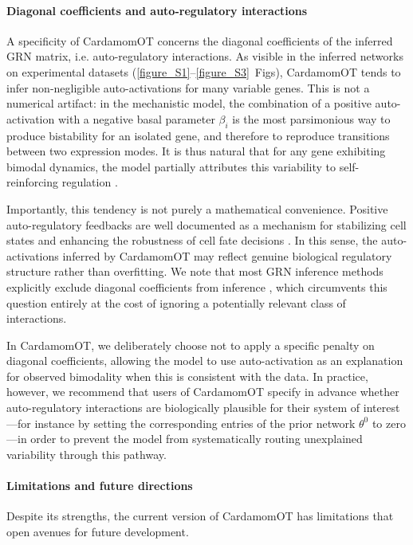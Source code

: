 \documentclass[a4paper, 11pt]{article}
\theoremstyle{plain}
\theoremstyle{remark}
\begin{document}
\paragraph{Diagonal coefficients and auto-regulatory interactions}
A specificity of CardamomOT concerns the diagonal coefficients of the inferred GRN matrix, i.e. auto-regulatory interactions. As visible in the inferred networks on experimental datasets (\ref{figure_S1}--\ref{figure_S3}~Figs), CardamomOT tends to infer non-negligible auto-activations for many variable genes. This is not a numerical artifact: in the mechanistic model, the combination of a positive auto-activation with a negative basal parameter $\beta_i$ is the most parsimonious way to produce bistability for an isolated gene, and therefore to reproduce transitions between two expression modes. It is thus natural that for any gene exhibiting bimodal dynamics, the model partially attributes this variability to self-reinforcing regulation \cite{bonnaffoux2019wasabi}.

Importantly, this tendency is not purely a mathematical convenience. Positive auto-regulatory feedbacks are well documented as a mechanism for stabilizing cell states and enhancing the robustness of cell fate decisions \cite{ferrell2002self}. In this sense, the auto-activations inferred by CardamomOT may reflect genuine biological regulatory structure rather than overfitting. We note that most GRN inference methods explicitly exclude diagonal coefficients from inference \cite{sanguinetti2019gene}, which circumvents this question entirely at the cost of ignoring a potentially relevant class of interactions.

In CardamomOT, we deliberately choose not to apply a specific penalty on diagonal coefficients, allowing the model to use auto-activation as an explanation for observed bimodality when this is consistent with the data. In practice, however, we recommend that users of CardamomOT specify in advance whether auto-regulatory interactions are biologically plausible for their system of interest—for instance by setting the corresponding entries of the prior network $\theta^0$ to zero—in order to prevent the model from systematically routing unexplained variability through this pathway.

\paragraph{Limitations and future directions}
Despite its strengths, the current version of CardamomOT has limitations that open avenues for future development.\\
\end{document}
